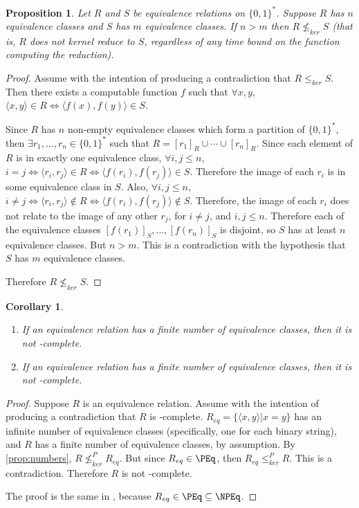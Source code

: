 \documentclass[draft]{article}
\newtheorem{proposition}[proposition]{Proposition}
\newtheorem{corollary}[corollary]{Corollary}
\theoremstyle{definition} \newtheorem{openproblem}[openproblem]{Open problem}
\theoremstyle{definition} \newtheorem{definition}[definition]{Definition}
\newcommand{\sigmastar}{\{0, 1\}^{*}} %
\newcommand{\kr}{\leq^{P}_{ker}} %
\newcommand{\nkr}{\nleq^{P}_{ker}} %
\newcommand{\krnt}{\leq_{ker}} %
\newcommand{\nkrnt}{\nleq_{ker}} %
\newcommand{\pair}[2]{\langle#1,#2\rangle} %
\begin{document}
\begin{proposition}\label{prop:numbers}
  Let $R$ and $S$ be equivalence relations on $\sigmastar$.
  Suppose $R$ has $n$ equivalence classes and $S$ has $m$ equivalence classes.
  If $n>m$ then $R\nkrnt S$ (that is, $R$ does not kernel reduce to $S$, regardless of any time bound on the function computing the reduction).
\end{proposition}
\begin{proof}
  Assume with the intention of producing a contradiction that $R\krnt S$.
  Then there exists a computable function $f$ such that $\forall x,y$, $\pair{x}{y}\in R\iff \pair{f(x)}{f(y)}\in S$.

  Since $R$ has $n$ non-empty equivalence classes which form a partition of $\sigmastar$, then $\exists r_1,\ldots,r_n\in\sigmastar$ such that $R=[r_1]_R\cup\cdots\cup[r_n]_R$.
  Since each element of $R$ is in exactly one equivalence class, $\forall i,j\leq n$, $i=j\iff\pair{r_i}{r_j}\in R\iff\pair{f(r_i)}{f(r_j)}\in S$.
  Therefore the image of each $r_i$ is in some equivalence class in $S$.
  Also, $\forall i,j\leq n$, $i\neq j\iff \pair{r_i}{r_j}\notin R\iff \pair{f(r_i)}{f(r_j)}\notin S$.
  Therefore, the image of each $r_i$ does not relate to the image of any other $r_j$, for $i\neq j$, and $i,j\leq n$.
  Therefore each of the equivalence classes $[f(r_1)]_S,\ldots,[f(r_n)]_S$ is disjoint, so $S$ has at least $n$ equivalence classes.
  But $n>m$.
  This is a contradiction with the hypothesis that $S$ has $m$ equivalence classes.

  Therefore $R\nkrnt S$.
\end{proof}

\begin{corollary}\label{cor:finite}
  \mbox{}
  \begin{enumerate}
    \renewcommand{\labelenumi}{\roman{enumi}.}
  \item If an equivalence relation has a finite number of equivalence classes, then it is not \PEq-complete.
  \item If an equivalence relation has a finite number of equivalence classes, then it is not \NPEq-complete.
  \end{enumerate}
\end{corollary}
\begin{proof}
  Suppose $R$ is an equivalence relation.
  Assume with the intention of producing a contradiction that $R$ is \PEq-complete.
  $R_{eq}=\{\pair{x}{y}|x=y\}$ has an infinite number of equivalence classes (specifically, one for each binary string), and $R$ has a finite number of equivalence classes, by assumption.
  By \autoref{prop:numbers}, $R\nkr R_{eq}$.
  But since $R_{eq}\in\PEq$, then $R_{eq}\kr R$.
  This is a contradiction.
  Therefore $R$ is not \PEq-complete.

  The proof is the same in \NPEq, because $R_{eq}\in\PEq\subseteq\NPEq$.
\end{proof}
\end{document}
